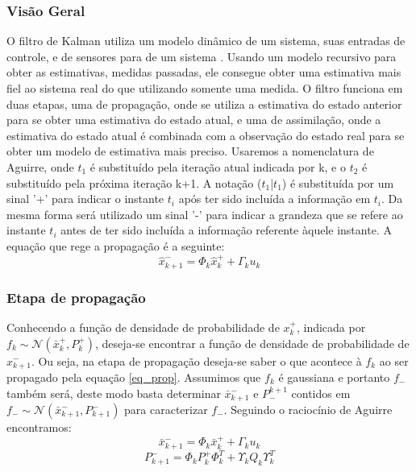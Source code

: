 \subsubsection{Visão Geral}
O filtro de Kalman utiliza um modelo dinâmico de um sistema, suas entradas de controle, e  de sensores para  de um sistema . Usando um modelo recursivo para obter as estimativas, medidas passadas, ele consegue obter uma estimativa mais fiel ao sistema real do que utilizando somente uma medida. O filtro funciona em duas etapas, uma de propagação, onde se utiliza a estimativa do estado anterior para se obter uma estimativa do estado atual, e uma de assimilação, onde a estimativa do estado atual é combinada com a observação do estado real para se obter um modelo de estimativa mais preciso. 
\newline
Usaremos a nomenclatura de Aguirre, onde $t_1$ é substituído pela iteração atual indicada por k, e o $t_2$ é substituído pela próxima iteração k+1. A notação ($t_1$|$t_1$) é substituída por um sinal '+' para indicar o instante $t_i$ após ter sido incluída a informação em $t_i$. Da mesma forma será utilizado um sinal '-' para indicar a grandeza que se refere ao instante $t_i$ antes de ter sido incluída a informação referente àquele instante. A equação que rege a propagação é a seguinte:
\begin{equation} \label{eq_prop}
\hat{x}^{-}_{k+1}=\Phi_k \hat{x}^+_k+\Gamma_ku_k
\end{equation}

\subsubsection{Etapa de propagação}
Conhecendo a função de densidade de probabilidade de $x_k^+$, indicada por $f_k\sim \mathcal{N}(\bar{x}^+_k, P^+_k)$, deseja-se encontrar a função de densidade de probabilidade de $x^-_{k+1}$. Ou seja, na etapa de propagação deseja-se saber o que acontece à $f_k$ ao ser propagado pela equação \ref{eq_prop}. Assumimos que $f_k$ é gaussiana e portanto $f_-$ também será, deste modo basta determinar $\bar{x}^-_{k+1}$ e $P_-^{k+1}$ contidos em $f_- \sim \mathcal{N}(\bar{x}^-_{k+1},P^-_{k+1})$ para caracterizar $f_-$.
\newline
Seguindo o raciocínio de  Aguirre encontramos:
\begin{equation}
\bar{x}^-_{k+1}=\Phi_k\bar{x}^+_k+\Gamma_ku_k
\end{equation}
\begin{equation}
P^-_{k+1}=\Phi_kP^+_k\Phi^T_k+\Upsilon_kQ_k\Upsilon^T_k
\end{equation}

